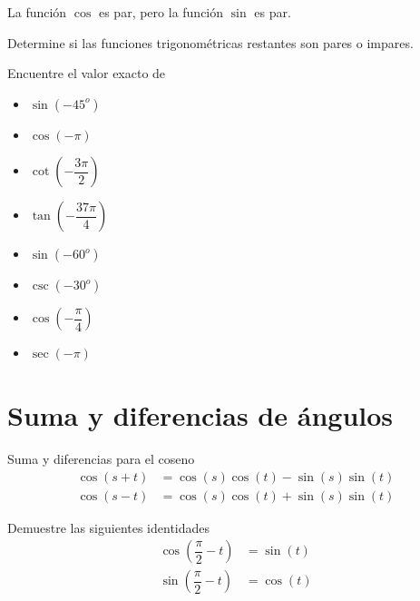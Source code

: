 	\begin{prop}
		La función $\cos$ es par, pero la función $\sin$ es par. 
	\end{prop}
	

{}
	\begin{problema}
		Determine si las funciones trigonométricas restantes son pares o impares.
	\end{problema}
	

{}
	\begin{problema}
		\label{exmp:0607}
		Encuentre el valor exacto de 
		\begin{itemize}
			\item $\sin(-45^{o})$ 
			\item $\cos(-\pi)$ 
			\item $\cot\left( -\dfrac{3\pi}{2} \right)$ 
			\item $\tan\left( -\dfrac{37\pi}{4} \right)$
		\end{itemize}
		
	\end{problema}
	

{}
	\begin{problema}
		\begin{itemize}
			\item $\sin(-60^{o})$
			\item $\csc(-30^{o})$
			\item $\cos\left( -\dfrac{\pi}{4} \right)$
			\item $\sec(-\pi)$
		\end{itemize}
		
	\end{problema}


\section{Suma y diferencias de ángulos}

{Suma y diferencias para el coseno}
	\begin{align*}
		\cos(s+t) &= \cos(s)\cos(t)-\sin(s)\sin(t) \\  
		\cos(s-t) &= \cos(s)\cos(t)+\sin(s)\sin(t)
	\end{align*}



	\begin{problema} Demuestre las siguientes identidades
		\begin{align*}
			\cos\left(\dfrac{\pi}{2}-t\right) &= \sin(t) \\
			\sin\left(\dfrac{\pi}{2}-t\right) &= \cos(t) 
		\end{align*}
	\end{problema}


